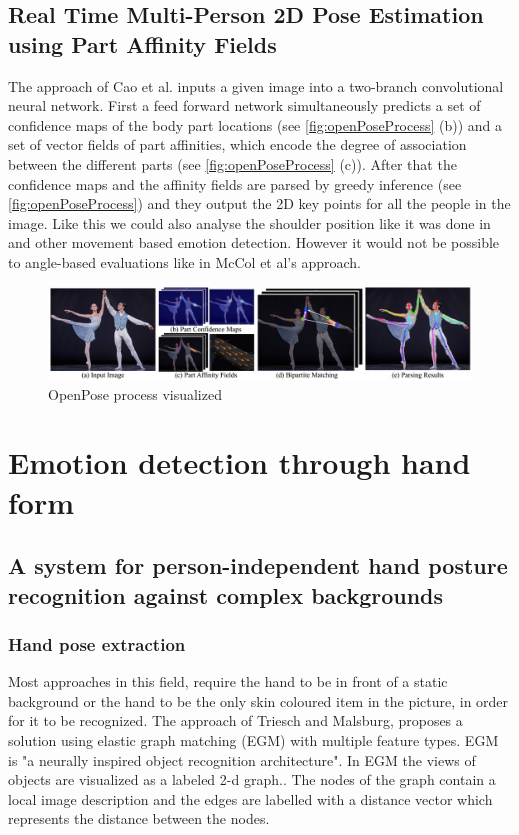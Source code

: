 \documentclass[conference]{IEEEtran}
\begin{document}
\subsection{Real Time Multi-Person 2D Pose Estimation using Part Affinity Fields}
The approach of Cao et al.\cite{cao2017realtime} inputs a given image into a two-branch convolutional neural network. First a feed forward network simultaneously predicts a set of confidence maps of the body part locations (see \autoref{fig:openPoseProcess} (b)) and a set of vector fields of part affinities, which encode the degree of association between the different parts (see \autoref{fig:openPoseProcess} (c))\cite{cao2017realtime}. After that the confidence maps and the affinity fields are parsed by greedy inference (see \autoref{fig:openPoseProcess}) and they output the 2D key points for all the people in the image\cite{cao2017realtime}.
Like this we could also analyse the shoulder position like it was done in \cite{barathi2016lie} and other movement based emotion detection. However it would not be possible to angle-based evaluations like in McCol et al's approach\cite{mccoll2012affect}. 

\begin{figure}[H]
\centering
\includegraphics[width=\linewidth]{openPoseProcess.jpg}
\caption{OpenPose process visualized\cite{cao2017realtime}}
\label{fig:openPoseProcess}
\end{figure}

\section{Emotion detection through hand form}
\label{sec:emotionHand}
\subsection{A system for person-independent hand posture recognition against complex backgrounds}
\subsubsection{Hand pose extraction}
Most approaches in this field, require the hand to be in front of a static background or the hand to be the only skin coloured item in the picture, in order for it to be recognized\cite{cui1995learning,hunter1995posture,kohler1997technical,min1999visual}. The approach of Triesch and Malsburg\cite{triesch2001system}, proposes a solution using elastic graph matching (EGM) with multiple feature types. EGM is "a neurally inspired object recognition architecture"\cite{lades1993distortion}. In EGM the views of objects are visualized as a labeled 2-d graph.\cite{triesch2001system}. The nodes of the graph contain a local image description and the edges are labelled with a distance vector which represents the distance between the nodes. 
\end{document}
